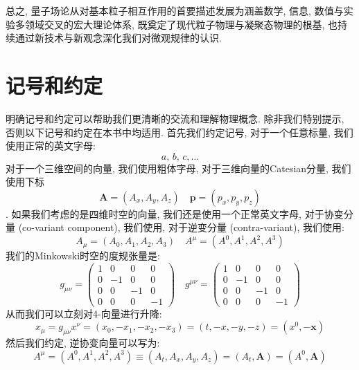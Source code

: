 总之, 量子场论从对基本粒子相互作用的首要描述发展为涵盖数学, 信息, 数值与实验多领域交叉的宏大理论体系, 既奠定了现代粒子物理与凝聚态物理的根基, 也持续通过新技术与新观念深化我们对微观规律的认识.


\section{记号和约定}
\label{CH1 S1 Notation and convention}
明确记号和约定可以帮助我们更清晰的交流和理解物理概念.
除非我们特别提示, 否则以下记号和约定在本书中均适用.
首先我们约定记号, 对于一个任意标量, 我们使用正常的英文字母:
\begin{equation}
  a,\, b,\, c, \ldots
\end{equation}
对于一个三维空间的向量, 我们使用粗体字母, 对于三维向量的Catesian分量, 我们使用下标
\begin{equation}
  \bm{A} = (A_x, A_y, A_z) \quad \bm{p} = (p_x, p_y, p_z)
\end{equation}
.
如果我们考虑的是四维时空的向量, 我们还是使用一个正常英文字母, 对于协变分量 (co-variant component), 我们使用, 对于逆变分量 (contra-variant), 我们使用:
\begin{equation}
  A_\mu = (A_0, A_1, A_2, A_3) \quad A^\mu = (A^0, A^1, A^2, A^3)
\end{equation}
我们的Minkowski时空的度规张量是:
\begin{equation}
  g_{\mu\nu} = \begin{pmatrix}
    1 & 0 & 0 & 0 \\
    0 & -1 & 0 & 0 \\
    0 & 0 & -1 & 0 \\
    0 & 0 & 0 & -1
  \end{pmatrix} \quad
  g^{\mu\nu} = \begin{pmatrix}
    1 & 0 & 0 & 0 \\
    0 & -1 & 0 & 0 \\
    0 & 0 & -1 & 0 \\
    0 & 0 & 0 & -1
  \end{pmatrix}
\end{equation}
从而我们可以立刻对4-向量进行升降:
\begin{equation}
  x_\mu = g_{\mu\nu} x^\nu = (x_0, -x_1, -x_2, -x_3) = (t, -x, -y, -z) = (x^0, -\bm{x})
\end{equation}
然后我们约定, 逆协变向量可以写为:
\begin{equation}
  A^\mu = (A^0, A^1, A^2, A^3) \equiv (A_t, A_x, A_y, A_z) = (A_t, \bm{A}) = (A^0, \bm{A})
\end{equation}
